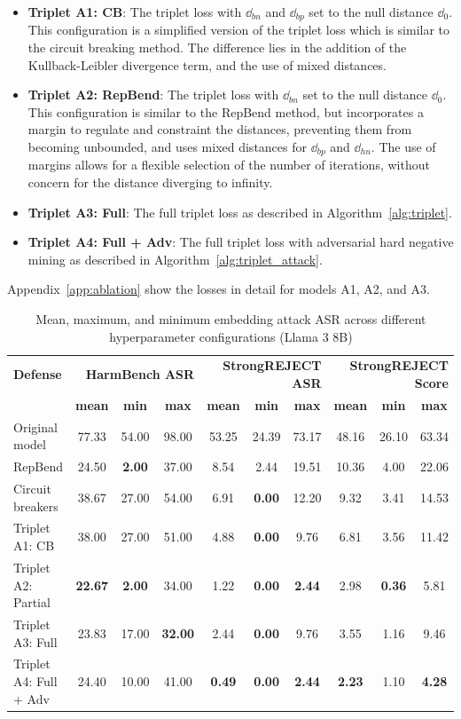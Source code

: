 \documentclass[11pt]{article}
\begin{document}
\begin{itemize}[nolistsep]
	\item \textbf{Triplet A1: CB}: The triplet loss with $\dd_{bn}$ and $\dd_{bp}$ set to the null distance $\dd_{0}$.
			This configuration is a simplified version of the triplet loss which is similar to the circuit breaking method.
			The difference lies in the addition of the Kullback-Leibler divergence term, and the use of mixed distances.
	\item \textbf{Triplet A2: RepBend}: The triplet loss with $\dd_{bn}$ set to the null distance $\dd_{0}$.
			This configuration is similar to the RepBend method, but incorporates a margin to regulate and constraint the distances, preventing them from becoming unbounded, and uses mixed distances for $\dd_{bp}$ and $\dd_{hn}$.
			The use of margins allows for a flexible selection of the number of iterations, without concern for the distance diverging to infinity.
	\item \textbf{Triplet A3: Full}: The full triplet loss as described in Algorithm~\ref{alg:triplet}.
	\item \textbf{Triplet A4: Full + Adv}: The full triplet loss with adversarial hard negative mining as described in Algorithm~\ref{alg:triplet_attack}.
\end{itemize}


Appendix~\ref{app:ablation} show the losses in detail for models A1, A2, and A3.

\begin{table}[ht]
\begin{tabular}{lccccccccc}
\hline
\textbf{Defense} & \multicolumn{3}{r}{\textbf{HarmBench ASR}} & \multicolumn{3}{r}{\textbf{StrongREJECT ASR}} & \multicolumn{3}{r}{\textbf{StrongREJECT Score}} \\
 & \textbf{mean} & \textbf{min} & \textbf{max} & \textbf{mean} & \textbf{min} & \textbf{max} & \textbf{mean} & \textbf{min} & \textbf{max} \\
\hline
Original model & 77.33 & 54.00 & 98.00 & 53.25 & 24.39 & 73.17 & 48.16 & 26.10 & 63.34 \\
RepBend & 24.50 & \textbf{2.00} & 37.00 & 8.54 & 2.44 & 19.51 & 10.36 & 4.00 & 22.06 \\
Circuit breakers & 38.67 & 27.00 & 54.00 & 6.91 & \textbf{0.00} & 12.20 & 9.32 & 3.41 & 14.53 \\
\hline
Triplet A1: CB & 38.00 & 27.00 & 51.00 & 4.88 & \textbf{0.00} & 9.76 & 6.81 & 3.56 & 11.42 \\
Triplet A2: Partial & \textbf{22.67} & \textbf{2.00} & 34.00 & 1.22 & \textbf{0.00} & \textbf{2.44} & 2.98 & \textbf{0.36} & 5.81 \\
Triplet A3: Full & 23.83 & 17.00 & \textbf{32.00} & 2.44 & \textbf{0.00} & 9.76 & 3.55 & 1.16 & 9.46 \\
Triplet A4: Full + Adv & 24.40 & 10.00 & 41.00 & \textbf{0.49} & \textbf{0.00} & \textbf{2.44} & \textbf{2.23} & 1.10 & \textbf{4.28} \\
\hline
\end{tabular}
\caption{Mean, maximum, and minimum embedding attack ASR across different hyperparameter configurations (Llama 3 8B)}
\label{tab:robustness_ablation}
\end{table}
\end{document}
